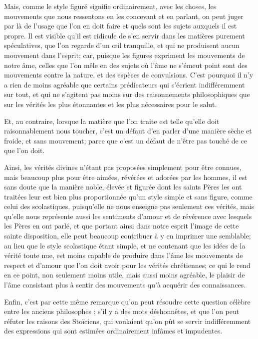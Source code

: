 Mais, comme le style figuré signifie ordinairement, avec les choses, les mouvements que nous ressentons en les concevant et en parlant, on peut juger par là de l'usage que l'on en doit faire et quels sont les sujets auxquels il est propre. Il est visible qu'il est ridicule de s'en servir dans les matières purement spéculatives, que l'on regarde d'un œil tranquille, et qui ne produisent aucun mouvement dans l'esprit; car, puisque les figures expriment les mouvements de notre âme, celles que l'on mêle en des sujets où l'âme ne s'émeut point sont des mouvements contre la nature, et des espèces de convulsions. C'est pourquoi il n'y a rien de moins agréable que certains prédicateurs qui s'écrient indifféremment sur tout, et qui ne s'agitent pas moins sur des raisonnements philosophiques que sur les vérités les plus étonnantes et les plus nécessaires pour le salut.

Et, au contraire, lorsque la matière que l'on traite est telle qu'elle doit raisonnablement nous toucher, c'est un défaut d'en parler d'une manière sèche et froide, et sans mouvement; parce que c'est un défaut de n'être pas touché de ce que l'on doit.

Ainsi, les vérités divines n'étant pas proposées simplement pour être connues, mais beaucoup plus pour être aimées, révérées et adorées par les hommes, il est sans doute que la manière noble, élevée et figurée dont les saints Pères les ont traitées leur est bien plus proportionnée qu'un style simple et sans figure, comme celui des scolastiques, puisqu'elle ne nous enseigne pas seulement ces vérités, mais qu'elle nous représente aussi les sentiments d'amour et de révérence avec lesquels les Pères en ont parlé, et que portant ainsi dans notre esprit l'image de cette sainte disposition, elle peut beaucoup contribuer à y en imprimer une semblable; au lieu que le style scolastique étant simple, et ne contenant que les idées de la vérité toute nue, est moins capable de produire dans l'âme les mouvements de respect et d'amour que l'on doit avoir pour les vérités chrétiennes; ce qui le rend en ce point, non seulement moins utile, mais aussi moins agréable, le plaisir de l'âme consistant plus à sentir des mouvements qu'à acquérir des connaissances.

Enfin, c'est par cette même remarque qu'on peut résoudre cette question célèbre entre les anciens philosophes : s'il y a des mots déshonnêtes, et que l'on peut réfuter les raisons des Stoïciens, qui voulaient qu'on pût se servir indifféremment des expressions qui sont estimées ordinairement infâmes et impudentes.

